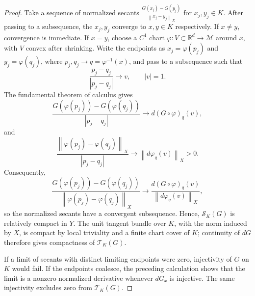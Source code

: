 \documentclass[10pt,a4paper]{amsart}
\newcommand{\RR}{\mathbb{R}}
\newcommand{\calM}{\mathcal{M}}
\newcommand{\calT}{\mathcal{T}}
\newcommand{\norm}[1]{\left\lVert #1\right\rVert}
\begin{document}
\begin{proof}
Take a sequence of normalized secants $\frac{G(x_j)-G(y_j)}{\norm{x_j-y_j}_X}$ for $x_j,y_j\in K$. After passing to a subsequence, the $x_j,y_j$ converge to $x,y\in K$ respectively. If $x\neq y$, convergence is immediate. If $x=y$, choose a $C^1$ chart $\varphi:V\subset\RR^d\to\calM$ around $x$, with $V$ convex after shrinking. Write the endpoints as $x_j=\varphi(p_j)$ and $y_j=\varphi(q_j)$, where $p_j,q_j\to q=\varphi^{-1}(x)$, and pass to a subsequence such that
\[
    \frac{p_j-q_j}{|p_j-q_j|}\longrightarrow v,\qquad |v|=1.
\]
The fundamental theorem of calculus gives
\[
    \frac{G(\varphi(p_j))-G(\varphi(q_j))}{|p_j-q_j|}
    \longrightarrow d(G\circ\varphi)_{q}(v),
\]
and
\[
    \frac{\norm{\varphi(p_j)-\varphi(q_j)}_X}{|p_j-q_j|}
    \longrightarrow \norm{d\varphi_q(v)}_X>0.
\]
Consequently,
\[
    \frac{G(\varphi(p_j))-G(\varphi(q_j))}
         {\norm{\varphi(p_j)-\varphi(q_j)}_X}
    \longrightarrow
    \frac{d(G\circ\varphi)_q(v)}{\norm{d\varphi_q(v)}_X},
\]
so the normalized secants have a convergent subsequence. Hence, $\mathcal S_K(G)$ is relatively compact in $Y$. The unit tangent bundle over $K$, with the norm induced by $X$, is compact by local triviality and a finite chart cover of $K$; continuity of $dG$ therefore gives compactness of $\calT_K(G)$.

If a limit of secants with distinct limiting endpoints were zero, injectivity of $G$ on $K$ would fail. If the endpoints coalesce, the preceding calculation shows that the limit is a nonzero normalized derivative whenever $dG_x$ is injective. The same injectivity excludes zero from $\calT_K(G)$.
\end{proof}
\end{document}
